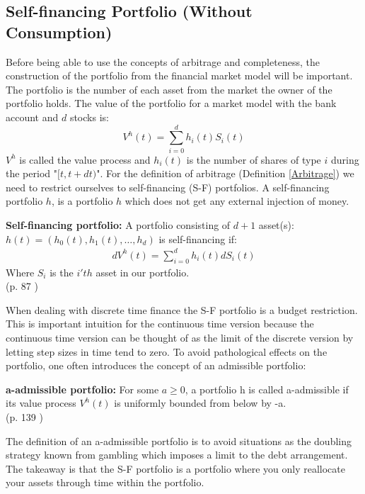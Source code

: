 \subsection{Self-financing Portfolio (Without Consumption)}
Before being able to use the concepts of arbitrage and completeness, the construction of the portfolio from the financial market model will be important. The portfolio is the number of each asset from the market the owner of the portfolio holds. The value of the portfolio for a market model with the bank account and $d$ stocks is:
\begin{equation*}
V^h(t)=\sum_{i=0}^{d} h_{i}(t) S_i(t)
\end{equation*}
$V^h$ is called the value process and $h_i(t)$ is the number of shares of type $i$ during the period "$[t,t+dt)$". For the definition of arbitrage (Definition \ref{Arbitrage}) we need to restrict ourselves to self-financing (S-F) portfolios. A self-financing portfolio $h$, is a portfolio $h$ which does not get any external injection of money.
\theoremstyle{definition}
\begin{definition}{\textbf{Self-financing portfolio: }}
A portfolio consisting of $d+1$ asset(s): \\
$h(t)=(h_0(t),h_1(t), \dotsc, h_{d})$ is self-financing if:
\begin{equation*}\label{SF}
\begin{split}
dV^{h}(t)=\sum_{i=0}^{d} h_{i}(t) dS_{i}(t)
\end{split}
\end{equation*}
Where $S_{i}$ is the $i'th$ asset in our portfolio.\\ \null \hfill (p. 87 \parencite{finKont})
\end{definition}
When dealing with discrete time finance the S-F portfolio is a budget restriction. This is important intuition for the continuous time version because the continuous time version can be thought of as the limit of the discrete version by letting step sizes in time tend to zero. To avoid pathological effects on the portfolio, one often introduces the concept of an admissible portfolio:
\theoremstyle{definition}
\begin{definition}{\textbf{a-admissible portfolio: }}
For some $a\geq 0$, a portfolio h is called a-admissible if its value process $V^h(t)$ is uniformly bounded from below by -a.\\
\null \hfill (p. 139 \parencite{finKont})
\end{definition}
The definition of an a-admissible portfolio is to avoid situations as the doubling strategy known from gambling which imposes a limit to the debt arrangement. The takeaway is that the S-F portfolio is a portfolio where you only reallocate your assets through time within the portfolio.

